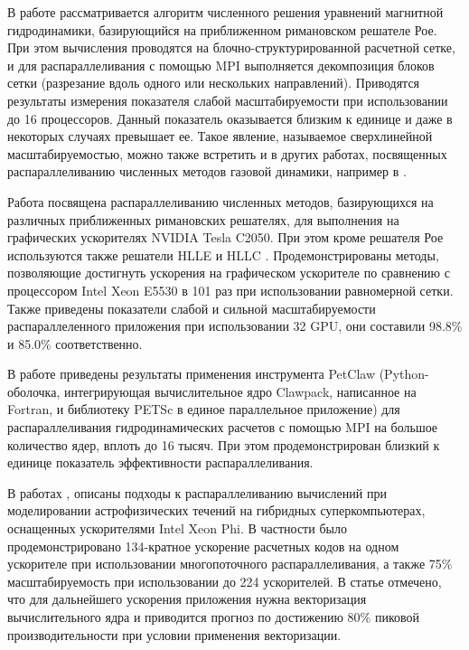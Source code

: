 \documentclass[utf8]{psta}
\begin{document}
В работе \cite{Shumlak} рассматривается алгоритм численного решения уравнений магнитной гидродинамики, базирующийся на приближенном римановском решателе Рое.
При этом вычисления проводятся на блочно-структурированной расчетной сетке, и для распараллеливания с помощью MPI выполняется декомпозиция блоков сетки (разрезание вдоль одного или нескольких направлений).
Приводятся результаты измерения показателя слабой масштабируемости при использовании до 16 процессоров.
Данный показатель оказывается близким к единице и даже в некоторых случаях превышает ее.
Такое явление, называемое сверхлинейной масштабируемостью, можно также встретить и в других работах, посвященных распараллеливанию численных методов газовой динамики, например в \cite{Benderskij}.

Работа \cite{Schive} посвящена распараллеливанию численных методов, базирующихся на различных приближенных римановских решателях, для выполнения на графических ускорителях NVIDIA Tesla C2050.
При этом кроме решателя Рое используются также решатели HLLE и HLLC \cite{Kong}.
Продемонстрированы методы, позволяющие достигнуть ускорения на графическом ускорителе по сравнению с процессором Intel Xeon E5530 в 101 раз при использовании равномерной сетки.
Также приведены показатели слабой и сильной масштабируемости распараллеленного приложения при использовании 32 GPU, они составили 98.8\% и 85.0\% соответственно. 

В работе \cite{Mandli} приведены результаты применения инструмента PetClaw (Python-оболочка, интегрирующая вычислительное ядро Clawpack, написанное на Fortran, и библиотеку PETSc в единое параллельное приложение) для распараллеливания гидродинамических расчетов с помощью MPI на большое количество ядер, вплоть до 16 тысяч.
При этом продемонстрирован близкий к единице показатель эффективности распараллеливания.

В работах \cite{Kulikov}, \cite{Kulikov2} описаны подходы к распараллеливанию вычислений при моделировании астрофизических течений на гибридных суперкомпьютерах, оснащенных ускорителями Intel Xeon Phi.
В частности было продемонстрировано 134-кратное ускорение расчетных кодов на одном ускорителе при использовании многопоточного распараллеливания, а также 75\% масштабируемость при использовании до 224 ускорителей.
В статье отмечено, что для дальнейшего ускорения приложения нужна векторизация вычислительного ядра и приводится прогноз по достижению 80\% пиковой производительности при условии применения векторизации.
\end{document}
